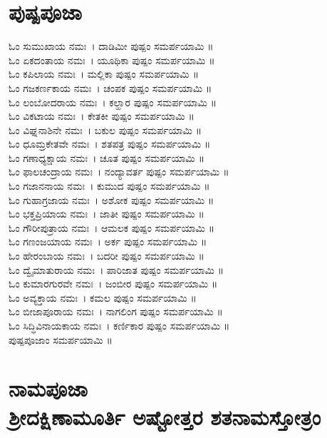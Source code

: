 \section{ಪುಷ್ಪಪೂಜಾ }
ಓಂ ಸುಮುಖಾಯ ನಮಃ~। ದಾಡಿಮೀ ಪುಷ್ಪಂ ಸಮರ್ಪಯಾಮಿ ॥\\
ಓಂ ಏಕದಂತಾಯ ನಮಃ~। ಯೂಥಿಕಾ ಪುಷ್ಪಂ ಸಮರ್ಪಯಾಮಿ ॥\\
ಓಂ ಕಪಿಲಾಯ ನಮಃ~। ಮಲ್ಲಿಕಾ ಪುಷ್ಪಂ ಸಮರ್ಪಯಾಮಿ ॥\\
ಓಂ ಗಜಕರ್ಣಕಾಯ ನಮಃ~। ಚಂಪಕ ಪುಷ್ಪಂ ಸಮರ್ಪಯಾಮಿ ॥\\
ಓಂ ಲಂಬೋದರಾಯ ನಮಃ~। ಕಲ್ಹಾರ ಪುಷ್ಪಂ ಸಮರ್ಪಯಾಮಿ ॥\\
ಓಂ ವಿಕಟಾಯ ನಮಃ~। ಕೇತಕೀ ಪುಷ್ಪಂ ಸಮರ್ಪಯಾಮಿ ॥\\
ಓಂ ವಿಘ್ನನಾಶಿನೇ ನಮಃ~। ಬಕುಲ ಪುಷ್ಪಂ ಸಮರ್ಪಯಾಮಿ ॥\\
ಓಂ ಧೂಮ್ರಕೇತವೇ ನಮಃ~। ಶತಪತ್ರ ಪುಷ್ಪಂ ಸಮರ್ಪಯಾಮಿ ॥\\
ಓಂ ಗಣಾಧ್ಯಕ್ಷಾಯ ನಮಃ~। ಚೂತ ಪುಷ್ಪಂ ಸಮರ್ಪಯಾಮಿ ॥\\
ಓಂ ಫಾಲಚಂದ್ರಾಯ ನಮಃ~। ನಂದ್ಯಾವರ್ತ ಪುಷ್ಪಂ ಸಮರ್ಪಯಾಮಿ ॥\\
ಓಂ ಗಜಾನನಾಯ ನಮಃ~। ಕುಮುದ ಪುಷ್ಪಂ ಸಮರ್ಪಯಾಮಿ ॥\\
ಓಂ ಗುಹಾಗ್ರಜಾಯ ನಮಃ~। ಅಶೋಕ ಪುಷ್ಪಂ ಸಮರ್ಪಯಾಮಿ ॥\\
ಓಂ ಭಕ್ತಪ್ರಿಯಾಯ ನಮಃ~। ಜಾತೀ ಪುಷ್ಪಂ ಸಮರ್ಪಯಾಮಿ ॥\\
ಓಂ ಗೌರೀಪುತ್ರಾಯ ನಮಃ~। ಆಮಲಕ ಪುಷ್ಪಂ ಸಮರ್ಪಯಾಮಿ ॥\\
ಓಂ ಗಣಂಜಯಾಯ ನಮಃ~। ಅರ್ಕ ಪುಷ್ಪಂ ಸಮರ್ಪಯಾಮಿ ॥\\
ಓಂ ಹೇರಂಬಾಯ ನಮಃ~। ಬದರೀ ಪುಷ್ಪಂ ಸಮರ್ಪಯಾಮಿ ॥\\
ಓಂ ದ್ವೈಮಾತುರಾಯ ನಮಃ~। ಪಾರಿಜಾತ ಪುಷ್ಪಂ ಸಮರ್ಪಯಾಮಿ ॥\\
ಓಂ ಕುಮಾರಗುರವೇ ನಮಃ~। ಜಂಬೀರ ಪುಷ್ಪಂ ಸಮರ್ಪಯಾಮಿ ॥\\
ಓಂ ಅವ್ಯಕ್ತಾಯ ನಮಃ~। ಕಮಲ ಪುಷ್ಪಂ ಸಮರ್ಪಯಾಮಿ ॥\\
ಓಂ ಬೀಜಾಪೂರಾಯ ನಮಃ~। ನಾಗಲಿಂಗ ಪುಷ್ಪಂ ಸಮರ್ಪಯಾಮಿ ॥\\
ಓಂ ಸಿದ್ಧಿವಿನಾಯಕಾಯ ನಮಃ~। ಕರ್ಣಿಕಾರ ಪುಷ್ಪಂ ಸಮರ್ಪಯಾಮಿ ॥\\
ಪುಷ್ಪಪೂಜಾಂ ಸಮರ್ಪಯಾಮಿ ॥
\section{ನಾಮಪೂಜಾ\\ಶ್ರೀದಕ್ಷಿಣಾಮೂರ್ತಿ ಅಷ್ಟೋತ್ತರ ಶತನಾಮಸ್ತೋತ್ರಂ }

